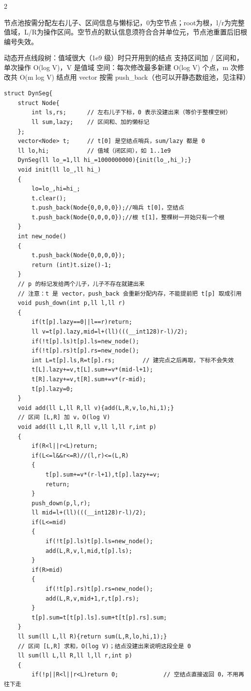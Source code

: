 \documentclass[UTF8,fontset=fandol,a4paper,twoside]{ctexart}
\newcommand{\note}[1]{{\fontsize{10}{12}\selectfont #1\par}}
\begin{document}
\begin{multicols}{2}
\note{节点池按需分配左右儿子、区间信息与懒标记，0为空节点；root为根，l/\allowbreak{}r为完整值域，L/\allowbreak{}R为操作区间。空节点的默认信息须符合合并单位元，节点池重置后旧根编号失效。}
\note{动态开点线段树：值域很大（1e9 级）时只开用到的结点 支持区间加 /\allowbreak{} 区间和，单次操作 O(\allowbreak{}log V)\allowbreak{}，V 是值域 空间：每次修改最多新建 O(\allowbreak{}log V)\allowbreak{} 个点，m 次修改共 O(\allowbreak{}m log V)\allowbreak{} 结点用 vector 按需 push\_back（也可以开静态数组池，见注释）}
\begin{lstlisting}
struct DynSeg{
    struct Node{
        int ls,rs;      // 左右儿子下标，0 表示没建出来（等价于整棵空树）
        ll sum,lazy;    // 区间和、加的懒标记
    };
    vector<Node> t;     // t[0] 是空结点哨兵，sum/lazy 都是 0
    ll lo,hi;           // 值域（闭区间），如 1..1e9
    DynSeg(ll lo_=1,ll hi_=1000000000){init(lo_,hi_);}
    void init(ll lo_,ll hi_)
    {
        lo=lo_,hi=hi_;
        t.clear();
        t.push_back(Node{0,0,0,0});//哨兵 t[0]，空结点
        t.push_back(Node{0,0,0,0});//根 t[1]，整棵树一开始只有一个根
    }
    int new_node()
    {
        t.push_back(Node{0,0,0,0});
        return (int)t.size()-1;
    }
    // p 的标记发给两个儿子，儿子不存在就建出来
    // 注意：t 是 vector，push_back 会重新分配内存，不能提前把 t[p] 取成引用
    void push_down(int p,ll l,ll r)
    {
        if(t[p].lazy==0||l==r)return;
        ll v=t[p].lazy,mid=l+(ll)(((__int128)r-l)/2);
        if(!t[p].ls)t[p].ls=new_node();
        if(!t[p].rs)t[p].rs=new_node();
        int L=t[p].ls,R=t[p].rs;        // 建完点之后再取，下标不会失效
        t[L].lazy+=v,t[L].sum+=v*(mid-l+1);
        t[R].lazy+=v,t[R].sum+=v*(r-mid);
        t[p].lazy=0;
    }
    void add(ll L,ll R,ll v){add(L,R,v,lo,hi,1);}
    // 区间 [L,R] 加 v，O(log V)
    void add(ll L,ll R,ll v,ll l,ll r,int p)
    {
        if(R<l||r<L)return;
        if(L<=l&&r<=R)//(l,r)<=(L,R)
        {
            t[p].sum+=v*(r-l+1),t[p].lazy+=v;
            return;
        }
        push_down(p,l,r);
        ll mid=l+(ll)(((__int128)r-l)/2);
        if(L<=mid)
        {
            if(!t[p].ls)t[p].ls=new_node();
            add(L,R,v,l,mid,t[p].ls);
        }
        if(R>mid)
        {
            if(!t[p].rs)t[p].rs=new_node();
            add(L,R,v,mid+1,r,t[p].rs);
        }
        t[p].sum=t[t[p].ls].sum+t[t[p].rs].sum;
    }
    ll sum(ll L,ll R){return sum(L,R,lo,hi,1);}
    // 区间 [L,R] 求和，O(log V)；结点没建出来说明这段全是 0
    ll sum(ll L,ll R,ll l,ll r,int p)
    {
        if(!p||R<l||r<L)return 0;             // 空结点直接返回 0，不用再往下走

\end{lstlisting}
\end{multicols}
\end{document}
